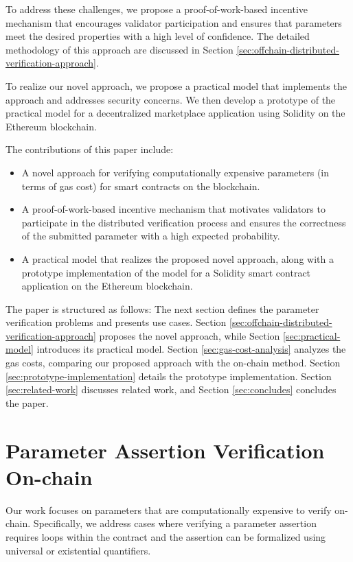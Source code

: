 \documentclass[runningheads]{llncs}
\begin{document}
To address these challenges, we propose a proof-of-work-based incentive mechanism that encourages validator participation and ensures that parameters meet the desired properties with a high level of confidence. The detailed methodology of this approach are discussed in Section \ref{sec:offchain-distributed-verification-approach}.

To realize our novel approach, we propose a practical model that implements the approach and addresses security concerns. We then develop a prototype of the practical model for a decentralized marketplace application using Solidity on the Ethereum blockchain.

The contributions of this paper include:
\begin{itemize}
    \item A novel approach for verifying computationally expensive parameters (in terms of gas cost) for smart contracts on the blockchain.
    \item A proof-of-work-based incentive mechanism that motivates validators to participate in the distributed verification process and ensures the correctness of the submitted parameter with a high expected probability.
    \item A practical model that realizes the proposed novel approach, along with a prototype implementation of the model for a Solidity smart contract application on the Ethereum blockchain.
\end{itemize}


The paper is structured as follows: The next section defines the parameter verification problems and presents use cases. Section \ref{sec:offchain-distributed-verification-approach} proposes the novel approach, while Section \ref{sec:practical-model} introduces its practical model. Section \ref{sec:gas-cost-analysis} analyzes the gas costs, comparing our proposed approach with the on-chain method. Section \ref{sec:prototype-implementation} details the prototype implementation. Section \ref{sec:related-work} discusses related work, and Section \ref{sec:concludes} concludes the paper.
\section{Parameter Assertion Verification On-chain}
\label{sec:parameter-assertion-verification-onchain}
Our work focuses on parameters that are computationally expensive to verify on-chain. Specifically, we address cases where verifying a parameter assertion requires loops within the contract and the assertion can be formalized using universal or existential quantifiers.
\end{document}
